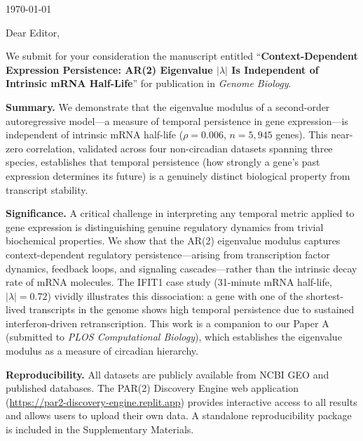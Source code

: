 \documentclass[11pt,letterpaper]{article}
\begin{document}
\today

\vspace{1cm}

Dear Editor,

\vspace{0.5cm}

We submit for your consideration the manuscript entitled ``\textbf{Context-Dependent Expression Persistence: AR(2) Eigenvalue $|\lambda|$ Is Independent of Intrinsic mRNA Half-Life}'' for publication in \textit{Genome Biology}.

\vspace{0.3cm}

\textbf{Summary.} We demonstrate that the eigenvalue modulus of a second-order autoregressive model---a measure of temporal persistence in gene expression---is independent of intrinsic mRNA half-life ($\rho = 0.006$, $n = 5{,}945$ genes). This near-zero correlation, validated across four non-circadian datasets spanning three species, establishes that temporal persistence (how strongly a gene's past expression determines its future) is a genuinely distinct biological property from transcript stability.

\vspace{0.3cm}

\textbf{Significance.} A critical challenge in interpreting any temporal metric applied to gene expression is distinguishing genuine regulatory dynamics from trivial biochemical properties. We show that the AR(2) eigenvalue modulus captures context-dependent regulatory persistence---arising from transcription factor dynamics, feedback loops, and signaling cascades---rather than the intrinsic decay rate of mRNA molecules. The IFIT1 case study (31-minute mRNA half-life, $|\lambda| = 0.72$) vividly illustrates this dissociation: a gene with one of the shortest-lived transcripts in the genome shows high temporal persistence due to sustained interferon-driven retranscription. This work is a companion to our Paper A (submitted to \textit{PLOS Computational Biology}), which establishes the eigenvalue modulus as a measure of circadian hierarchy.

\vspace{0.3cm}

\textbf{Reproducibility.} All datasets are publicly available from NCBI GEO and published databases. The PAR(2) Discovery Engine web application (\url{https://par2-discovery-engine.replit.app}) provides interactive access to all results and allows users to upload their own data. A standalone reproducibility package is included in the Supplementary Materials.
\end{document}
